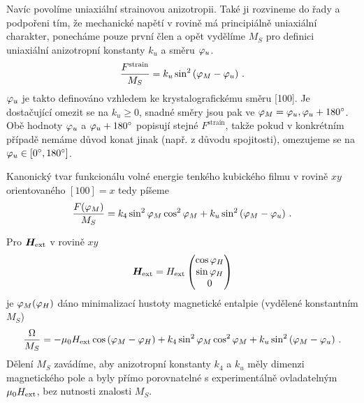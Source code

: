 Navíc povolíme uniaxiální strainovou anizotropii.
Také ji rozvineme do řady a podpořeni tím, že mechanické napětí v rovině má principiálně uniaxiální charakter, ponecháme pouze první člen a opět vydělíme $M_S$ pro definici uniaxiální anizotropní konstanty $k_u$ a směru $\varphi_u$.
\begin{equation}
    \frac{F^\textrm{strain}}{M_S}=k_u \sin^2\left( \varphi_M-\varphi_u  \right) \,.
\end{equation}
$\varphi_u$ je takto definováno vzhledem ke krystalografickému směru [100].
Je dostačující omezit se na $k_u\geq 0$, snadné směry jsou pak ve $\varphi_M=\varphi_u, \varphi_u+\SI{180}{\degree}$.
Obě hodnoty $\varphi_u$ a $\varphi_u+\SI{180}{\degree}$ popisují stejné $F^\textrm{strain}$, takže pokud v konkrétním případě nemáme důvod konat jinak (např. z důvodu spojitosti), omezujeme se na $\varphi_u \in [\SI{0}{\degree}, \SI{180}{\degree}]$.

Kanonický tvar funkcionálu volné energie tenkého kubického filmu v rovině $xy$ orientovaného $[100]=x$ tedy píšeme
\begin{equation}
\label{eqn:SW-funkcional}
    \frac{F(\varphi_M)}{M_S}=k_4 \sin^2 \varphi_M \cos^2 \varphi_M + k_u \sin^2\left( \varphi_M-\varphi_u  \right) \,.
\end{equation}

Pro $\bm{H}_\textrm{ext}$ v rovině $xy$
\begin{equation}
    \bm{H}_\textrm{ext} =H_\textrm{ext} \begin{pmatrix} \cos \varphi_H \\ \sin \varphi_H \\ 0 \end{pmatrix}
\end{equation}
je $\varphi_M(\varphi_H)$ dáno minimalizací hustoty magnetické entalpie (vydělené konstantním $M_S$)
\begin{equation}
    \label{eqn:magneticka-entalpie-v-rovine}
    \frac{\Omega}{M_S}=-\mu_0 H_\textrm{ext} \cos \left(\varphi_M-\varphi_H \right) + k_4 \sin^2 \varphi_M \cos^2 \varphi_M + k_u \sin^2\left( \varphi_M-\varphi_u  \right) \,.
\end{equation}
Dělení $M_S$ zavádíme, aby anizotropní konstanty $k_4$ a $k_u$ měly dimenzi magnetického pole a byly přímo porovnatelné s experimentálně ovladatelným $\mu_0H_\textrm{ext}$, bez nutnosti znalosti $M_S$.

